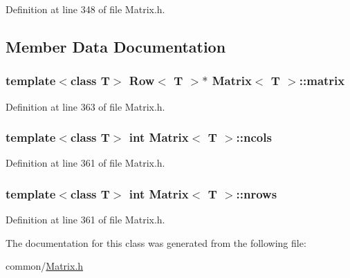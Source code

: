 Definition at line 348 of file Matrix.h.



\subsection{Member Data Documentation}
\hypertarget{classMatrix_a433500d09b0f8495dcc2c86ee9224508}{
\subsubsection[{matrix}]{\setlength{\rightskip}{0pt plus 5cm}template$<$class T$>$ {\bf Row}$<$ T $>$$\ast$ {\bf Matrix}$<$ T $>$::{\bf matrix}}}
\label{classMatrix_a433500d09b0f8495dcc2c86ee9224508}


Definition at line 363 of file Matrix.h.

\hypertarget{classMatrix_a30b634d02c22a903661761ef74189ae0}{
\subsubsection[{ncols}]{\setlength{\rightskip}{0pt plus 5cm}template$<$class T$>$ int {\bf Matrix}$<$ T $>$::{\bf ncols}}}
\label{classMatrix_a30b634d02c22a903661761ef74189ae0}


Definition at line 361 of file Matrix.h.

\hypertarget{classMatrix_adaa4451e47cf953a563db25d155acbcc}{
\subsubsection[{nrows}]{\setlength{\rightskip}{0pt plus 5cm}template$<$class T$>$ int {\bf Matrix}$<$ T $>$::{\bf nrows}}}
\label{classMatrix_adaa4451e47cf953a563db25d155acbcc}


Definition at line 361 of file Matrix.h.



The documentation for this class was generated from the following file:\begin{DoxyCompactItemize}
\item 
common/\hyperlink{Matrix_8h}{Matrix.h}\end{DoxyCompactItemize}
